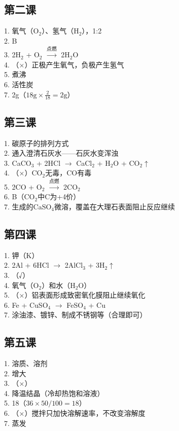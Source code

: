 \documentclass[a4paper,12pt]{ctexart}
\begin{document}
\subsection*{第二课}
1. 氧气（O$_2$）、氢气（H$_2$），1:2\\
2. B\\
3. 2H$_2$ + O$_2$ $\xrightarrow{\text{点燃}}$ 2H$_2$O\\
4. （×）正极产生氧气，负极产生氢气\\
5. 煮沸\\
6. 活性炭\\
7. 2g（$18\text{g} \times \frac{2}{18} = 2\text{g}$）

\subsection*{第三课}
1. 碳原子的排列方式\\
2. 通入澄清石灰水——石灰水变浑浊\\
3. CaCO$_3$ + 2HCl $\rightarrow$ CaCl$_2$ + H$_2$O + CO$_2$$\uparrow$\\
4. （×）CO$_2$无毒，CO有毒\\
5. 2CO + O$_2$ $\xrightarrow{\text{点燃}}$ 2CO$_2$\\
6. B（CO$_2$中C为+4价）\\
7. 生成的CaSO$_4$微溶，覆盖在大理石表面阻止反应继续

\subsection*{第四课}
1. 钾（K）\\
2. 2Al + 6HCl $\rightarrow$ 2AlCl$_3$ + 3H$_2$$\uparrow$\\
3. （√）\\
4. 氧气（O$_2$）和水（H$_2$O）\\
5. （×）铝表面形成致密氧化膜阻止继续氧化\\
6. Fe + CuSO$_4$ $\rightarrow$ FeSO$_4$ + Cu\\
7. 涂油漆、镀锌、制成不锈钢等（合理即可）

\subsection*{第五课}
1. 溶质、溶剂\\
2. 增大\\
3. （×）\\
4. 降温结晶（冷却热饱和溶液）\\
5. 18（$36 \times 50/100 = 18$）\\
6. （×）搅拌只加快溶解速率，不改变溶解度\\
7. 蒸发
\end{document}
